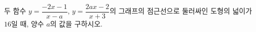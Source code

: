 \hspace*{2mm}\begin{minipage}[t]{\dimexpr\linewidth-2mm\relax}\vspace{0pt}
두 함수 $y=\dfrac{-2x-1}{x-a}$, $y=\dfrac{2ax-2}{x+3}$의 그래프의 점근선으로 둘러싸인 도형의 넓이가 $16$일 때, 양수 $a$의 값을 구하시오.\end{minipage}
